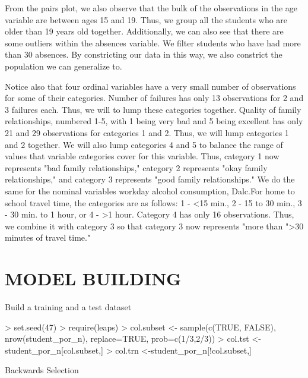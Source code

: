 \documentclass{article}
\begin{document}
From the pairs plot, we also observe that the bulk of the observations in the age variable are between ages 15 and 19. Thus, we group all the students who are older than 19 years old together. Additionally, we can also see that there are some outliers within the absences variable. We filter students who have had more than 30 absences. By constricting our data in this way, we also constrict the population we can generalize to. 


Notice also that four ordinal variables have a very small number of observations for some of their categories. Number of failures has only 13 observations for 2 and 3 failures each. Thus, we will to lump these categories together. Quality of family relationships, numbered 1-5, with 1 being very bad and 5 being excellent has only 21 and 29 observations for categories 1 and 2. Thus, we will lump categories 1 and 2 together. We will also lump categories 4 and 5 to balance the range of values that variable categories cover for this variable. Thus, category 1 now represents "bad family relationships," category 2 represents "okay family relationships," and category 3 represents "good family relationships." We do the same for the nominal variables workday alcohol consumption, Dalc.For home to school travel time, the categories are as follows: 1 - <15 min., 2 - 15 to 30 min., 3 - 30 min. to 1 hour, or 4 - >1 hour. Category 4 has only 16 observations. Thus, we combine it with category 3 so that category 3 now represents "more than ">30 minutes of travel time."




\section{MODEL BUILDING}
Build a training and a test dataset
\begin{Schunk}
\begin{Sinput}
> set.seed(47)
> require(leaps)
> col.subset <- sample(c(TRUE, FALSE), nrow(student_por_n), replace=TRUE, prob=c(1/3,2/3))
> col.tst <- student_por_n[col.subset,]
> col.trn <-student_por_n[!col.subset,]
\end{Sinput}
\end{Schunk}

Backwards Selection
\end{document}
